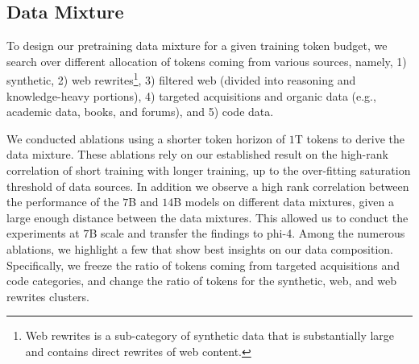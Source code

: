 \documentclass[11pt]{article}
\newcommand{\modelwithoutspace}{\textsf{phi-4}}
\begin{document}
\subsection{Data Mixture}
To design our pretraining data mixture for a given training token budget, we search over different allocation of tokens coming from various sources, namely, 1) synthetic, 2) web rewrites\footnote{Web rewrites is a sub-category of synthetic data that is substantially large and contains direct rewrites of web content.}, 3) filtered web (divided into reasoning and knowledge-heavy portions), 4) targeted acquisitions and organic data (e.g., academic data, books, and forums), and 5) code data. 

We conducted ablations using a shorter token horizon of $1$T tokens to derive the data mixture. These ablations rely on our established result on the high-rank correlation of short training with longer training, up to the over-fitting saturation threshold of data sources. In addition we observe a high rank correlation between the performance of the $7$B and $14$B models on different data mixtures, given a large enough distance between the data mixtures. This allowed us to conduct the experiments at $7$B scale and transfer the findings to \modelwithoutspace. Among the numerous ablations, we highlight a few that show best insights on our data composition. Specifically, we freeze the ratio of tokens coming from targeted acquisitions and code categories, and change the ratio of tokens for the synthetic, web, and web rewrites clusters. 


\begin{table}[ht]
\centering
{}
\caption{Ablations on the allocation of $75\%$ of training tokens to synthetic (S), filtered web (W), and web rewrite (WR) categories, while other data sources are held constant in the remaining $25\%$ token budget. All benchmark numbers are measured relative to the final data mixture used for training \modelwithoutspace.}
\label{tab:data_mixture_ablation}
\end{table}
\end{document}
